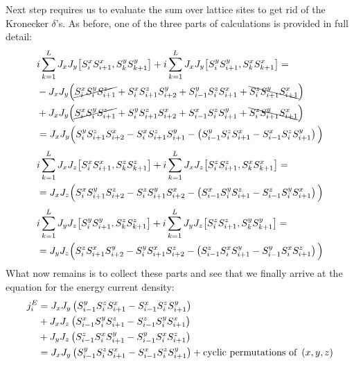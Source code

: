 Next step requires us to evaluate the sum over lattice sites to get rid of the Kronecker \(\delta{}\)'s. As before, one of the three parts of calculations is provided in full detail:
\begin{align*}
    &i\sum_{k=1}^{L}  J_{x} J_{y}\comm{\Sx_{i}\Sx_{i+1}}{\Sy_{k}\Sy_{k+1}} + i\sum_{k=1}^{L} J_{x} J_{y}\comm{\Sy_{i}\Sy_{i+1}}{\Sx_{k}\Sx_{k+1}} = \\
    & - J_x J_y \Big( \cancel{\Sx_i \Sy_i \Sz_{i+1}} +  \Sx_i \Sz_{i+1} \Sy_{i+2} + \Sy_{i-1} \Sz_i \Sx_{i+1} +\bcancel{\Sz_i \Sy_{i+1} \Sx_{i+1}}\Big)\\
    &+  J_x J_y \Big(  \cancel{\Sx_i \Sy_i \Sz_{i+1}} + \Sy_i \Sz_{i+1} \Sx_{i+2} + \Sx_{i-1} \Sz_i \Sy_{i+1} + \bcancel{\Sz_i \Sy_{i+1} \Sx_{i+1}}\Big)\\
    &= J_x J_y \Big( \Sy_i \Sz_{i+1} \Sx_{i+2} - \Sx_i \Sz_{i+1} \Sy_{i+1} - \left(\Sy_{i-1}\Sz_i \Sx_{i+1} - \Sx_{i-1}\Sz_{i}\Sy_{i+1}\right) \Big)
\end{align*}
\begin{align*}
    &i\sum_{k=1}^{L}  J_{x} J_{z}\comm{\Sx_{i}\Sx_{i+1}}{\Sz_{k}\Sz_{k+1}} + i\sum_{k=1}^{L} J_{x} J_{z}\comm{\Sz_{i}\Sz_{i+1}}{\Sx_{k}\Sx_{k+1}} = \\
    &= J_x J_z \Big( \Sx_i \Sy_{i+1} \Sz_{i+2} - \Sz_i \Sy_{i+1} \Sx_{i+2} - \left(\Sx_{i-1}\Sy_i \Sz_{i+1} - \Sz_{i-1}\Sy_{i}\Sx_{i+1}\right) \Big)
\end{align*}
\begin{align*}    
    &i\sum_{k=1}^{L}  J_{y} J_{z}\comm{\Sy_{i}\Sy_{i+1}}{\Sz_{k}\Sz_{k+1}} + i\sum_{k=1}^{L} J_{y} J_{z}\comm{\Sz_{i}\Sz_{i+1}}{\Sy_{k}\Sy_{k+1}} = \\
    &= J_y J_z \Big( \Sz_i \Sx_{i+1} \Sy_{i+2} - \Sy_i \Sx_{i+1} \Sz_{i+2} - \left(\Sz_{i-1}\Sx_i \Sy_{i+1} - \Sy_{i-1}\Sx_{i}\Sz_{i+1}\right) \Big)
\end{align*}
What now remains is to collect these parts and see that we finally arrive at the equation for the energy current density:
\begin{align}
    j_i^E &= J_x J_y \left(S^{y}_{i-1}S^{z}_i S^{x}_{i+1} - S^{x}_{i-1}S^{z}_{i}S^{y}_{i+1}\right) \nonumber \\
    &+ J_x J_z \left(S^{x}_{i-1}S^{y}_i S^{z}_{i+1} - S^{z}_{i-1}S^{y}_{i}S^{x}_{i+1}\right) \nonumber \\
    &+ J_y J_z \left(S^{z}_{i-1}S^{x}_i S^{y}_{i+1} - S^{y}_{i-1}S^{x}_{i}S^{z}_{i+1}\right) \nonumber \\
    &= J_x J_y \left(S^{y}_{i-1}S^{z}_i S^{x}_{i+1} - S^{x}_{i-1}S^{z}_{i}S^{y}_{i+1}\right) + \text{cyclic permutations of } \left(x,y,z\right)
    \label{eq:energy current density}
\end{align}
